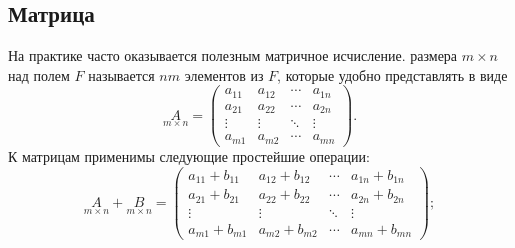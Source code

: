 \subsection{Матрица}
На практике часто оказывается полезным матричное исчисление.  размера $m \times n$ над полем $F$ называется $nm$ элементов из $F$, которые удобно представлять в виде 
    \begin{equation}
        \underset{m \times n}{A} =
        \begin{pmatrix}
            a_{11} & a_{12} & \cdots & a_{1n}\\
            a_{21} & a_{22} & \cdots & a_{2n}\\
            \vdots & \vdots & \ddots & \vdots\\
            a_{m1} & a_{m2} & \cdots & a_{mn}
        \end{pmatrix}.
    \end{equation}
    К матрицам применимы следующие простейшие операции:
    \begin{equation}
    \underset{m \times n}{A} + \underset{m \times n}{B} =
    \begin{pmatrix}
        a_{11} + b_{11} & a_{12} + b_{12} & \cdots & a_{1n} +  b_{1n}\\
        a_{21} + b_{21} & a_{22} + b_{22}& \cdots & a_{2n} + b_{2n}\\
        \vdots & \vdots & \ddots & \vdots\\
        a_{m1} + b_{m1} & a_{m2} + b_{m2} & \cdots & a_{mn} +  b_{mn}
    \end{pmatrix};
    \end{equation}
